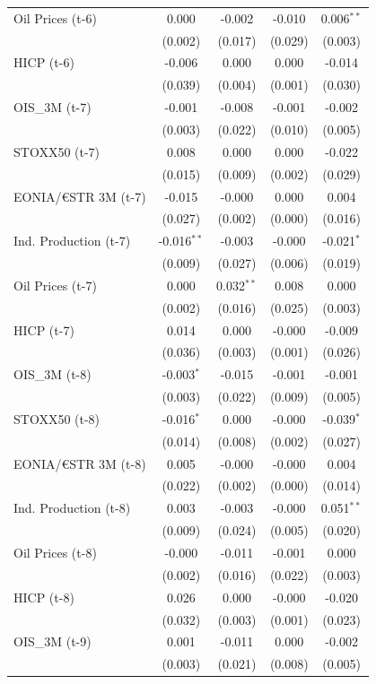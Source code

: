 \begin{longtable}[t]{lcccc}
Oil Prices (t-6) & 0.000 & -0.002 & -0.010 & 0.006$^{**}$\\
 & (0.002) & (0.017) & (0.029) & (0.003)\\
HICP (t-6) & -0.006 & 0.000 & 0.000 & -0.014\\
 & (0.039) & (0.004) & (0.001) & (0.030)\\
OIS\_3M (t-7) & -0.001 & -0.008 & -0.001 & -0.002\\
 & (0.003) & (0.022) & (0.010) & (0.005)\\
STOXX50 (t-7) & 0.008 & 0.000 & 0.000 & -0.022\\
 & (0.015) & (0.009) & (0.002) & (0.029)\\
EONIA/€STR 3M (t-7) & -0.015 & -0.000 & 0.000 & 0.004\\
 & (0.027) & (0.002) & (0.000) & (0.016)\\
Ind. Production (t-7) & -0.016$^{**}$ & -0.003 & -0.000 & -0.021$^{*}$\\
 & (0.009) & (0.027) & (0.006) & (0.019)\\
Oil Prices (t-7) & 0.000 & 0.032$^{**}$ & 0.008 & 0.000\\
 & (0.002) & (0.016) & (0.025) & (0.003)\\
HICP (t-7) & 0.014 & 0.000 & -0.000 & -0.009\\
 & (0.036) & (0.003) & (0.001) & (0.026)\\
OIS\_3M (t-8) & -0.003$^{*}$ & -0.015 & -0.001 & -0.001\\
 & (0.003) & (0.022) & (0.009) & (0.005)\\
STOXX50 (t-8) & -0.016$^{*}$ & 0.000 & -0.000 & -0.039$^{*}$\\
 & (0.014) & (0.008) & (0.002) & (0.027)\\
EONIA/€STR 3M (t-8) & 0.005 & -0.000 & -0.000 & 0.004\\
 & (0.022) & (0.002) & (0.000) & (0.014)\\
Ind. Production (t-8) & 0.003 & -0.003 & -0.000 & 0.051$^{**}$\\
 & (0.009) & (0.024) & (0.005) & (0.020)\\
Oil Prices (t-8) & -0.000 & -0.011 & -0.001 & 0.000\\
 & (0.002) & (0.016) & (0.022) & (0.003)\\
HICP (t-8) & 0.026 & 0.000 & -0.000 & -0.020\\
 & (0.032) & (0.003) & (0.001) & (0.023)\\
OIS\_3M (t-9) & 0.001 & -0.011 & 0.000 & -0.002\\
 & (0.003) & (0.021) & (0.008) & (0.005)\\

\end{longtable}
